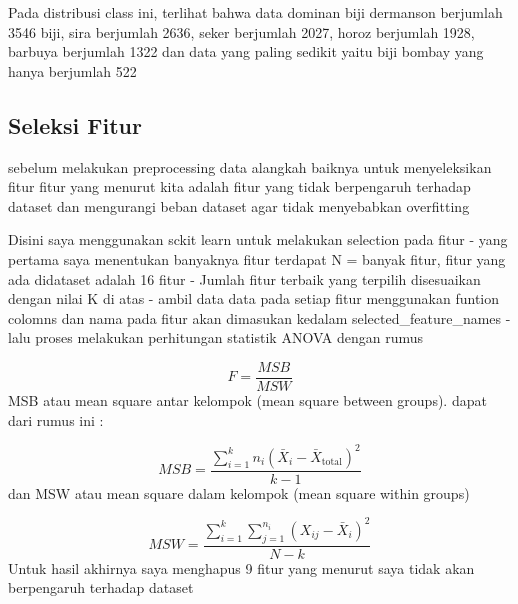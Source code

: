 \documentclass[
  letterpaper,
]{krantz}
\begin{document}
Pada distribusi class ini, terlihat bahwa data dominan biji dermanson
berjumlah 3546 biji, sira berjumlah 2636, seker berjumlah 2027, horoz
berjumlah 1928, barbuya berjumlah 1322 dan data yang paling sedikit
yaitu biji bombay yang hanya berjumlah 522

\hypertarget{seleksi-fitur}{%
\subsection{Seleksi Fitur}\label{seleksi-fitur}}

sebelum melakukan preprocessing data alangkah baiknya untuk
menyeleksikan fitur fitur yang menurut kita adalah fitur yang tidak
berpengaruh terhadap dataset dan mengurangi beban dataset agar tidak
menyebabkan overfitting

Disini saya menggunakan sckit learn untuk melakukan selection pada fitur
- yang pertama saya menentukan banyaknya fitur terdapat N = banyak
fitur, fitur yang ada didataset adalah 16 fitur - Jumlah fitur terbaik
yang terpilih disesuaikan dengan nilai K di atas - ambil data data pada
setiap fitur menggunakan funtion colomns dan nama pada fitur akan
dimasukan kedalam selected\_feature\_names - lalu proses melakukan
perhitungan statistik ANOVA dengan rumus

\[
F = \frac{MSB}{MSW}
\] MSB atau mean square antar kelompok (mean square between groups).
dapat dari rumus ini :

\[
MSB = \frac{\sum_{i=1}^{k} n_i (\bar{X}_i - \bar{X}_{\text{total}})^2}{k - 1}
\] dan MSW atau mean square dalam kelompok (mean square within groups)

\[
MSW = \frac{\sum_{i=1}^{k} \sum_{j=1}^{n_i} (X_{ij} - \bar{X}_i)^2}{N - k}
\] Untuk hasil akhirnya saya menghapus 9 fitur yang menurut saya tidak
akan berpengaruh terhadap dataset
\end{document}
